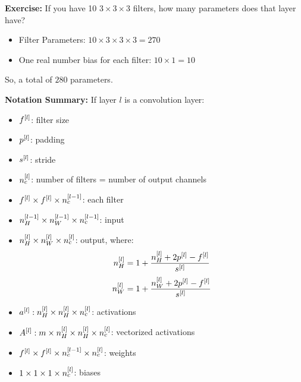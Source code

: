 \textbf{Exercise:} If you have 10 $3\times 3\times 3$ filters, 
how many parameters does that layer have?

\begin{itemize}
    \item Filter Parameters: $10\times 3\times 3\times 3 = 270$
    \item One real number bias for each filter: $10\times 1 = 10$
\end{itemize}

So, a total of $280$ parameters. 

\textbf{Notation Summary:} If layer $l$ is a convolution layer: 


\begin{itemize}
    \item $f^{[l]}$: filter size
    \item $p^{[l]}$: padding
    \item $s^{[l]}$: stride
    \item $n^{[l]}_c$: number of filters = number of output channels
    \item $f^{[l]} \times f^{[l]} \times n^{[l-1]}_c$: each filter
    \item $n^{[l-1]}_H\times n^{[l-1]}_W\times n^{[l-1]}_c$: input
    \item $n^{[l]}_H\times n^{[l]}_W\times n^{[l]}_c$: output, where: 
    $$
    n^{[l]}_H = 1 + \frac{n^{[l]}_H + 2p^{[l]} - f^{[l]}}{s^{[l]}}
    $$
    $$
    n^{[l]}_W = 1 + \frac{n^{[l]}_W + 2p^{[l]} - f^{[l]}}{s^{[l]}}
    $$
    \item $a^{[l]}: n^{[l]}_H\times n^{[l]}_H\times n^{[l]}_c$: activations
    \item $A^{[l]}: m\times n^{[l]}_H\times n^{[l]}_H\times n^{[l]}_c$: vectorized activations
    \item $f^{[l]} \times f^{[l]} \times n^{[l-1]}_c\times n^{[l]}_c$: weights
    \item $1\times 1\times 1\times n^{[l]}_c$: biases
\end{itemize}

